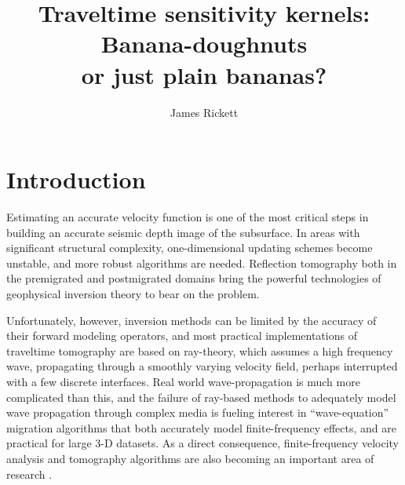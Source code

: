 \def\figdir{./Fig} 

\title{Traveltime sensitivity kernels: Banana-doughnuts \\ or just
plain bananas?}

\author{James Rickett}

\maketitle



\section{Introduction}
Estimating an accurate velocity function is one of the most critical
steps in building an accurate seismic depth image of the subsurface.
In areas with significant structural complexity, one-dimensional
updating schemes become unstable, and more robust algorithms are
needed.
Reflection tomography both in the premigrated \cite[]{bishop85} and
postmigrated domains \cite[]{stork92,kosloff96} bring the powerful
technologies of geophysical inversion theory
to bear on the problem. 

\par
Unfortunately, however, inversion methods can be limited by the
accuracy of their forward modeling operators, and most practical 
implementations of traveltime tomography are based on ray-theory,
which assumes a high frequency wave, propagating through a smoothly
varying velocity field, perhaps interrupted with a few discrete
interfaces. 
Real world wave-propagation is much more complicated than this, and 
the failure of ray-based methods to adequately model wave propagation
through complex media is fueling interest in ``wave-equation''
migration algorithms that both accurately model finite-frequency
effects, and are practical for large 3-D datasets.
As a direct consequence, finite-frequency velocity analysis and
tomography algorithms are also becoming an important area of research 
\cite[]{woodward92,biondi.segab99}.

